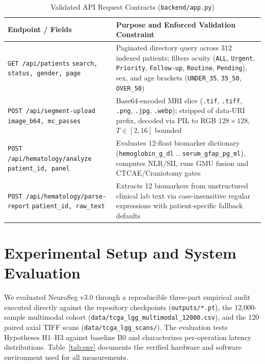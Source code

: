 \documentclass[conference]{IEEEtran}
\begin{document}
\begin{table}[t]
\centering
\caption{Validated API Request Contracts (\texttt{backend/app.py})}
\label{tab:contracts}
\begin{tabular}{@{}L{2.25cm}L{5.95cm}@{}}
\toprule
\textbf{Endpoint / Fields} & \textbf{Purpose and Enforced Validation Constraint} \\
\midrule
\texttt{GET /api/patients} \newline \texttt{search, status, gender, page} & Paginated directory query across 312 indexed patients; filters acuity (\texttt{ALL}, \texttt{Urgent}, \texttt{Priority}, \texttt{Follow-up}, \texttt{Routine}, \texttt{Pending}), sex, and age brackets (\texttt{UNDER\_35}, \texttt{35\_50}, \texttt{OVER\_50}) \\
\texttt{POST /api/segment-upload} \newline \texttt{image\_b64, mc\_passes} & Base64-encoded MRI slice (\texttt{.tif}, \texttt{.tiff}, \texttt{.png}, \texttt{.jpg}, \texttt{.webp}); stripped of data-URI prefix, decoded via PIL to RGB $128\times 128$, $T \in [2, 16]$ bounded \\
\texttt{POST /api/hematology}\newline\texttt{/analyze} \newline \texttt{patient\_id, panel} & Evaluates 12-float biomarker dictionary (\texttt{hemoglobin\_g\_dl} .. \texttt{serum\_gfap\_pg\_ml}), computes NLR/SII, runs GMU fusion and CTCAE/Craniotomy gates \\
\texttt{POST /api/hematology}\newline\texttt{/parse-report} \newline \texttt{patient\_id, raw\_text} & Extracts 12 biomarkers from unstructured clinical lab text via case-insensitive regular expressions with patient-specific fallback defaults \\
\bottomrule
\end{tabular}
\end{table}

\section{Experimental Setup and System Evaluation}
We evaluated NeuroSeg v3.0 through a reproducible three-part empirical audit executed directly against the repository checkpoints (\texttt{outputs/*.pt}), the 12,000-sample multimodal cohort (\texttt{data/tcga\_lgg\_multimodal\_12000.csv}), and the 120 paired axial TIFF scans (\texttt{data/tcga\_lgg\_scans/}). The evaluation tests Hypotheses H1--H3 against baseline B0 and characterizes per-operation latency distributions. Table~\ref{tab:env} documents the verified hardware and software environment used for all measurements.
\end{document}

